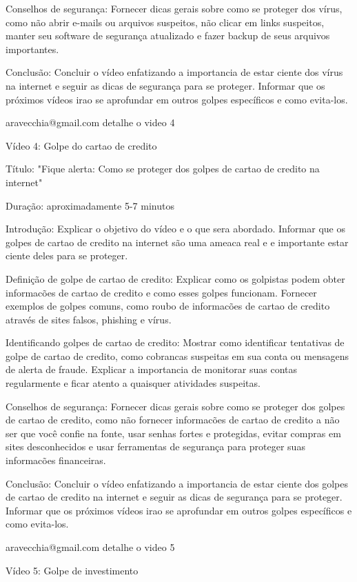 Conselhos de segurança: Fornecer dicas gerais sobre como se proteger dos vírus, como não abrir e-mails ou arquivos suspeitos, não clicar em links suspeitos, manter seu software de segurança atualizado e fazer backup de seus arquivos importantes.

Conclusão: Concluir o vídeo enfatizando a importancia de estar ciente dos vírus na internet e seguir as dicas de segurança para se proteger. Informar que os próximos vídeos irao se aprofundar em outros golpes específicos e como evita-los.

aravecchia@gmail.com
detalhe o video 4

Vídeo 4: Golpe do cartao de credito

Título: "Fique alerta: Como se proteger dos golpes de cartao de credito na internet"

Duração: aproximadamente 5-7 minutos

Introdução: Explicar o objetivo do vídeo e o que sera abordado. Informar que os golpes de cartao de credito na internet são uma ameaca real e e importante estar ciente deles para se proteger.

Definição de golpe de cartao de credito: Explicar como os golpistas podem obter informacões de cartao de credito e como esses golpes funcionam. Fornecer exemplos de golpes comuns, como roubo de informacões de cartao de credito através de sites falsos, phishing e vírus.

Identificando golpes de cartao de credito: Mostrar como identificar tentativas de golpe de cartao de credito, como cobrancas suspeitas em sua conta ou mensagens de alerta de fraude. Explicar a importancia de monitorar suas contas regularmente e ficar atento a quaisquer atividades suspeitas.

Conselhos de segurança: Fornecer dicas gerais sobre como se proteger dos golpes de cartao de credito, como não fornecer informacões de cartao de credito a não ser que você confie na fonte, usar senhas fortes e protegidas, evitar compras em sites desconhecidos e usar ferramentas de segurança para proteger suas informacões financeiras.

Conclusão: Concluir o vídeo enfatizando a importancia de estar ciente dos golpes de cartao de credito na internet e seguir as dicas de segurança para se proteger. Informar que os próximos vídeos irao se aprofundar em outros golpes específicos e como evita-los.

aravecchia@gmail.com
detalhe o video 5

Vídeo 5: Golpe de investimento

